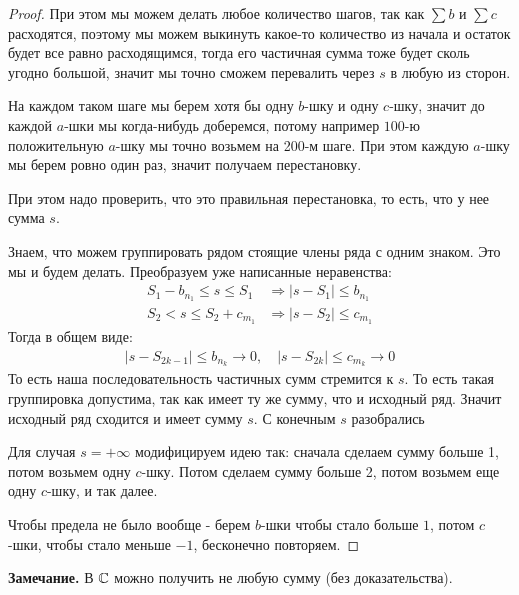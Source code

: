 \begin{proof}
    При этом мы можем делать любое количество шагов, так как $\sum b$ и $\sum c$ расходятся, поэтому мы можем
    выкинуть какое-то количество из начала и остаток будет все равно расходящимся, тогда его частичная сумма тоже будет сколь угодно большой,
    значит мы точно сможем перевалить через $s$ в любую из сторон.

    На каждом таком шаге мы берем хотя бы одну $b$-шку и одну $c$-шку, значит до каждой $a$-шки мы когда-нибудь доберемся, потому
    например $100$-ю положительную $a$-шку мы точно возьмем на 200-м шаге.
    При этом каждую $a$-шку мы берем ровно один раз, значит получаем перестановку.
    
    При этом надо проверить, что это правильная перестановка, то есть, что у нее сумма $s$.

    Знаем, что можем группировать рядом стоящие члены ряда с одним знаком. Это мы и будем делать. 
    Преобразуем уже написанные неравенства:
    \begin{align*}
        S_1 - b_{n_1} \leqslant s \leqslant S_1 &\Longrightarrow |s - S_1| \leqslant b_{n_1} \\
        S_2 < s \leqslant S_2 + c_{m_1} &\Longrightarrow |s - S_2| \leqslant c_{m_1}
    \end{align*}
    Тогда в общем виде:
    \begin{gather*}
        |s - S_{2k-1}| \leq b_{n_k} \to 0, \quad |s - S_{2k}| \leq c_{m_k} \to 0
    \end{gather*}
    То есть наша последовательность частичных сумм стремится к $s$. То есть такая группировка допустима, так как имеет ту же сумму, что и исходный ряд. 
    Значит исходный ряд сходится и имеет сумму $s$. С конечным $s$ разобрались

    Для случая $s = +\infty$ модифицируем идею так: сначала сделаем сумму больше 1, потом возьмем одну $c$-шку. Потом сделаем
    сумму больше 2, потом возьмем еще одну $c$-шку, и так далее. 
    
    Чтобы предела не было вообще - берем $b$-шки чтобы стало больше $1$,
    потом $c$-шки, чтобы стало меньше $-1$, бесконечно повторяем.
\end{proof}

\textbf{Замечание.} В $\mathbb{C}$ можно получить не любую сумму (без доказательства).

